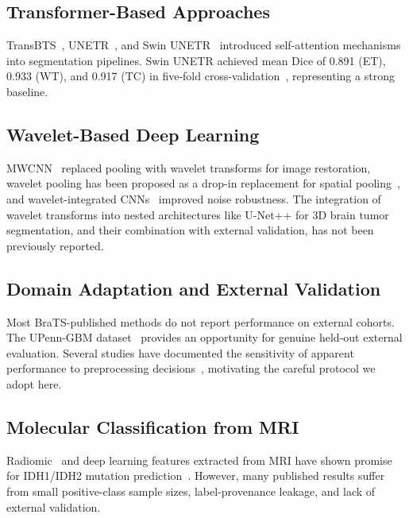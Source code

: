 \documentclass[conference]{IEEEtran}
\begin{document}
\subsection{Transformer-Based Approaches}

TransBTS~\cite{wang2021transbts}, UNETR~\cite{hatamizadeh2022unetr}, and Swin UNETR~\cite{hatamizadeh2022swinunetr} introduced self-attention mechanisms into segmentation pipelines. Swin UNETR achieved mean Dice of 0.891 (ET), 0.933 (WT), and 0.917 (TC) in five-fold cross-validation~\cite{hatamizadeh2022swinunetr}, representing a strong baseline.

\subsection{Wavelet-Based Deep Learning}

MWCNN~\cite{liu2018mwcnn} replaced pooling with wavelet transforms for image restoration, wavelet pooling has been proposed as a drop-in replacement for spatial pooling~\cite{williams2018wavelet}, and wavelet-integrated CNNs~\cite{li2020wavelet} improved noise robustness. The integration of wavelet transforms into nested architectures like U-Net++ for 3D brain tumor segmentation, and their combination with external validation, has not been previously reported.

\subsection{Domain Adaptation and External Validation}

Most BraTS-published methods do not report performance on external cohorts. The UPenn-GBM dataset~\cite{bakas2022upenn} provides an opportunity for genuine held-out external evaluation. Several studies have documented the sensitivity of apparent performance to preprocessing decisions~\cite{isensee2021nnu}, motivating the careful protocol we adopt here.

\subsection{Molecular Classification from MRI}

Radiomic~\cite{gillies2016radiomics} and deep learning features extracted from MRI have shown promise for IDH1/IDH2 mutation prediction~\cite{chang2018rnn}. However, many published results suffer from small positive-class sample sizes, label-provenance leakage, and lack of external validation.
\end{document}
